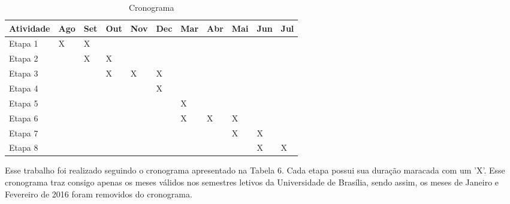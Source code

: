 \begin{table}[H]
\centering
\caption{Cronograma}
\label{my-label}
\begin{tabular}{|l|l|l|l|l|l|l|l|l|l|l|}
\hline
\rowcolor[HTML]{C0C0C0} 
Atividade                       & Ago & Set & Out & Nov & Dec & Mar & Abr & Mai & Jun & Jul \\ \hline
\cellcolor[HTML]{C0C0C0}Etapa 1 & X   & X   &     &     &     &     &     &     &     &     \\ \hline
\cellcolor[HTML]{C0C0C0}Etapa 2 &     & X   & X   &     &     &     &     &     &     &     \\ \hline
\cellcolor[HTML]{C0C0C0}Etapa 3 &     &     & X   & X   & X   &     &     &     &     &     \\ \hline
\cellcolor[HTML]{C0C0C0}Etapa 4 &     &     &     &     & X   &     &     &     &     &     \\ \hline
\cellcolor[HTML]{C0C0C0}Etapa 5 &     &     &     &     &     & X   &     &     &     &     \\ \hline
\cellcolor[HTML]{C0C0C0}Etapa 6 &     &     &     &     &     & X   & X   & X   &     &     \\ \hline
\cellcolor[HTML]{C0C0C0}Etapa 7 &     &     &     &     &     &     &     & X   & X   &     \\ \hline
\cellcolor[HTML]{C0C0C0}Etapa 8 &     &     &     &     &     &     &     &     & X   & X   \\ \hline
\end{tabular}
\end{table}

Esse trabalho foi realizado seguindo o cronograma apresentado na Tabela 6. Cada etapa possui sua duração maracada com um 'X'. Esse cronograma traz consigo apenas os meses válidos nos semestres letivos da Universidade de Brasília, sendo assim, os meses de Janeiro e Fevereiro de 2016 foram removidos do cronograma.
